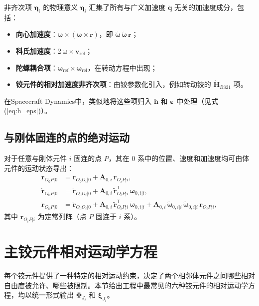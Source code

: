 \documentclass[10pt,a4paper]{book}
\theoremstyle{thmstyle}
\theoremstyle{defstyle}
\theoremstyle{prostyle}
\newcommand{\T}{^{\mathsf{T}}}
\renewcommand{\vec}[1]{\bm{#1}}
\newcommand{\mat}[1]{\bm{#1}}
\newcommand{\tildev}[1]{\tilde{#1}}
\begin{document}
\begin{mydefinition}{非齐次项 $\vec{\eta}_i$ 的物理意义}
$\vec{\eta}_i$ 汇集了所有与广义加速度 $\ddot{\vec{q}}$ 无关的加速度成分，包括：
\begin{itemize}
    \item \textbf{向心加速度}：$\vec{\omega} \times (\vec{\omega} \times \vec{r})$，即 $\tildev{\vec{\omega}}\,\tildev{\vec{\omega}}\,\vec{r}$；
    \item \textbf{科氏加速度}：$2\,\vec{\omega}\times \vec{v}_{\text{rel}}$；
    \item \textbf{陀螺耦合项}：$\vec{\omega}_{\text{ref}} \times \vec{\omega}_{\text{rel}}$，在转动方程中出现；
    \item \textbf{铰元件的相对加速度非齐次项}：由铰参数化引入，例如转动铰的 $\dot{\mat{H}}_{B321}$ 项。
\end{itemize}
在Spacecraft Dynamics中，类似地将这些项归入 $\vec{h}$ 和 $\vec{\varepsilon}$ 中处理（见式(\ref{eq:h_eps})）。
\end{mydefinition}

\subsection{与刚体固连的点的绝对运动}

对于任意与刚体元件 $i$ 固连的点 $P$，其在 $0$ 系中的位置、速度和加速度均可由体元件的运动状态导出：
\begin{subequations}
\begin{align}
\vec{r}_{O_0P|0} &= \vec{r}_{O_0O_i|0} + \mat{A}_{0,i}\,\vec{r}_{O_iP|i}, \label{eq:point_pos}\\
\dot{\vec{r}}_{O_0P|0} &= \dot{\vec{r}}_{O_0O_i|0}
+ \mat{A}_{0,i}\,\tildev{\vec{r}}_{O_iP|i}\T\,\vec{\omega}_{0,i|i}, \label{eq:point_vel}\\
\ddot{\vec{r}}_{O_0P|0} &= \ddot{\vec{r}}_{O_0O_i|0}
+ \mat{A}_{0,i}\,\tildev{\vec{r}}_{O_iP|i}\T\,\dot{\vec{\omega}}_{0,i|i}
+ \mat{A}_{0,i}\,\tildev{\vec{\omega}}_{0,i|i}\,\tildev{\vec{\omega}}_{0,i|i}\,\vec{r}_{O_iP|i},
\label{eq:point_acc}
\end{align}
\end{subequations}
其中 $\vec{r}_{O_iP|i}$ 为定常列阵（点 $P$ 固连于 $i$ 系）。


\section{主铰元件相对运动学方程}
\label{sec:joint_kin}

每个铰元件提供了一种特定的相对运动约束，决定了两个相邻体元件之间哪些相对自由度被允许、哪些被限制。本节给出工程中最常见的六种铰元件的相对运动学方程，均以统一形式输出 $\mat{\Phi}_{J_i}$ 和 $\vec{\xi}_{J_i}$。
\end{document}
